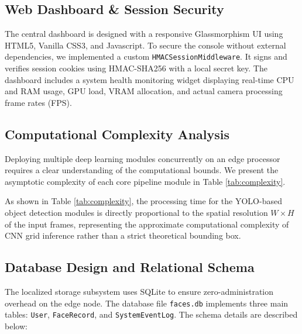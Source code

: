 \documentclass[12pt,a4paper]{article}
\begin{document}
\subsection{Web Dashboard \& Session Security}
The central dashboard is designed with a responsive Glassmorphism UI using HTML5, Vanilla CSS3, and Javascript. 
To secure the console without external dependencies, we implemented a custom \texttt{HMACSessionMiddleware}. It signs and verifies session cookies using HMAC-SHA256 with a local secret key. The dashboard includes a system health monitoring widget displaying real-time CPU and RAM usage, GPU load, VRAM allocation, and actual camera processing frame rates (FPS).

\subsection{Computational Complexity Analysis}
Deploying multiple deep learning modules concurrently on an edge processor requires a clear understanding of the computational bounds. We present the asymptotic complexity of each core pipeline module in Table \ref{tab:complexity}.

\begin{table}[h]
    \centering
    \caption{Computational Complexity of Proposed System Modules}
    \label{tab:complexity}
\end{table}

As shown in Table \ref{tab:complexity}, the processing time for the YOLO-based object detection modules is directly proportional to the spatial resolution $W \times H$ of the input frames, representing the approximate computational complexity of CNN grid inference rather than a strict theoretical bounding box.

\subsection{Database Design and Relational Schema}
The localized storage subsystem uses SQLite to ensure zero-administration overhead on the edge node. The database file \texttt{faces.db} implements three main tables: \texttt{User}, \texttt{FaceRecord}, and \texttt{SystemEventLog}. The schema details are described below:
\end{document}
